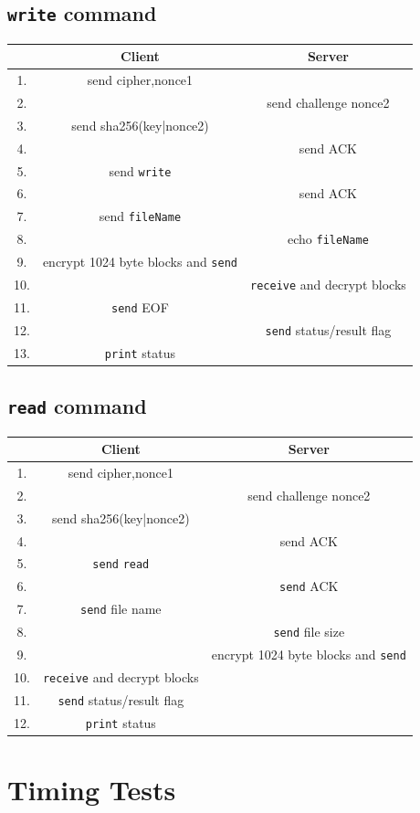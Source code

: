 \documentclass[11pt]{article}
\begin{document}
\subsection*{\texttt{write} command}
\begin{center}
\begin{tabular}{ |c|c|c| } 
 \hline
 ~& Client & Server\\
 \hline\hline
 1. & send cipher,nonce1 & ~\\
 \hline
 2. & ~& send challenge nonce2 \\
 \hline
 3. & send sha256(key|nonce2) & ~ \\
 \hline
 4. & ~& send ACK\\
 \hline
 5. & send \texttt{write} & ~ \\ 
 \hline
 6. & ~ & send ACK\\ 
 \hline
 7. & send \texttt{fileName} & ~ \\ 
 \hline
 8. & ~ & echo \texttt{fileName}\\
 \hline
 9. & encrypt 1024 byte blocks and \texttt{send} & ~\\
 \hline
 10. & ~& \texttt{receive} and decrypt blocks\\
 \hline
 11. &\texttt{send} EOF &~\\
 \hline
 12. & ~& \texttt{send} status/result flag\\
 \hline
 13. & \texttt{print} status & ~\\
 \hline
\end{tabular}
\end{center}

\subsection*{\texttt{read} command}
\begin{center}
\begin{tabular}{ |c|c|c| } 
 \hline
 ~& Client & Server\\
 \hline\hline
 1. & send cipher,nonce1 & ~\\
 \hline
 2. & ~& send challenge nonce2 \\
 \hline
 3. & send sha256(key|nonce2) & ~ \\
 \hline
 4. & ~& send ACK\\
 \hline
 5. & \texttt{send} \texttt{read} & ~ \\ 
 \hline
 6. & ~ & \texttt{send} {ACK} \\ 
 \hline
 7. & \texttt{send} file name & ~ \\ 
 \hline
 8. & ~ & \texttt{send} file size\\
 \hline
 9. & ~& encrypt 1024 byte blocks and \texttt{send}\\
 \hline
 10. & \texttt{receive} and decrypt blocks &~\\
 \hline
 11. & \texttt{send} status/result flag &~\\
 \hline
 12. & \texttt{print} status & ~\\
 \hline
\end{tabular}
\end{center}


\section*{Timing Tests}
\end{document}
